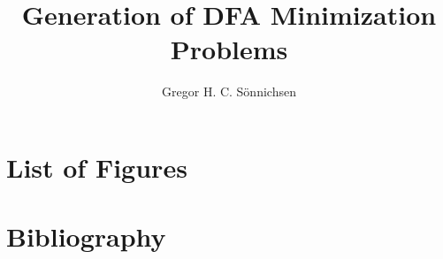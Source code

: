 \documentclass[a4paper, oneside, 12pt]{report}
\title{Generation of DFA Minimization Problems}
\author{Gregor H. C. Sönnichsen}
\theoremstyle{definition}
\theoremstyle{remark}
\begin{document}
	
	\maketitle
	
	
	
	\tableofcontents
	
	
	
	
	
	
	
	\appendix
	\chapter{List of Figures}
	\chapter{Bibliography}
	
	\nocite{*}
	
	
\end{document}
